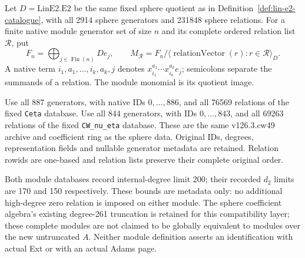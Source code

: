 \begin{definition}
  \label{def:lin-native-module-presentations}
  \leanok
  Let $D=\mathrm{LinE2.E2}$ be the same fixed sphere quotient as in
  Definition~\ref{def:lin-e2-catalogue}, with all 2914 sphere generators
  and 231848 sphere relations. For a finite native module generator set
  of size $n$ and its complete ordered relation list $\mathcal R$, put
  \[
    F_n=\bigoplus_{j\in\operatorname{Fin}(n)}D e_j,
    \qquad
    M_{\mathcal R}=F_n/
      \langle\operatorname{relationVector}(r):r\in\mathcal R\rangle_D.
  \]
  A native term $i_1,a_1,\ldots,i_k,a_k,j$ denotes
  $x_{i_1}^{a_1}\cdots x_{i_k}^{a_k}e_j$; semicolons separate the
  summands of a relation. The module monomial is its quotient image.

  Use all 887 generators, with native IDs $0,\ldots,886$, and all
  76569 relations of the fixed \texttt{Ceta} database. Use all 844
  generators, with IDs $0,\ldots,843$, and all 69263 relations of the
  fixed \texttt{CW\_nu\_eta} database. These are the same
  v126.3.cw49 archive and coefficient ring as the sphere data.
  Original IDs, degrees, representation fields and nullable generator
  metadata are retained. Relation rowids are one-based and relation
  lists preserve their complete original order.

  Both module databases record internal-degree limit 200; their
  recorded $d_2$ limits are 170 and 150 respectively. These bounds
  are metadata only: no additional high-degree zero relation is imposed
  on either module. The sphere coefficient algebra's existing degree-261
  truncation is retained for this compatibility layer; these complete
  modules are not claimed to be globally equivalent to modules over the
  new untruncated $A$. Neither module definition asserts an
  identification with actual Ext or with an actual Adams page.
\end{definition}

